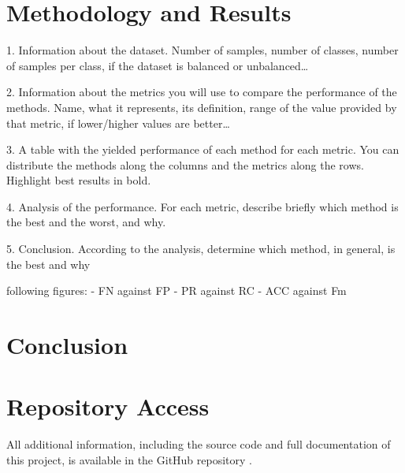 \documentclass{article}
\begin{document}
\section{Methodology and Results}

1. Information about the dataset. Number of samples, number of classes, 
number of samples per class, if the dataset is balanced or unbalanced…


2. Information about the metrics you will use to compare the performance 
of the methods. Name, what it represents, its definition, range of the 
value provided by that metric, if lower/higher values are better…


3. A table with the yielded performance of each method for each metric. 
You can distribute the methods along the columns and the metrics along 
the rows. Highlight best results in bold.


4. Analysis of the performance. For each metric, describe briefly which 
method is the best and the worst, and why.


5. Conclusion. According to the analysis, determine which method, in 
general, is the best and why




following figures: 
- FN against FP
- PR against RC
- ACC against Fm 
\section{Conclusion}


\section{Repository Access}

All additional information, including the source code and full documentation of this project, is available in the GitHub repository \cite{cuevas2024github}.


\end{document}

